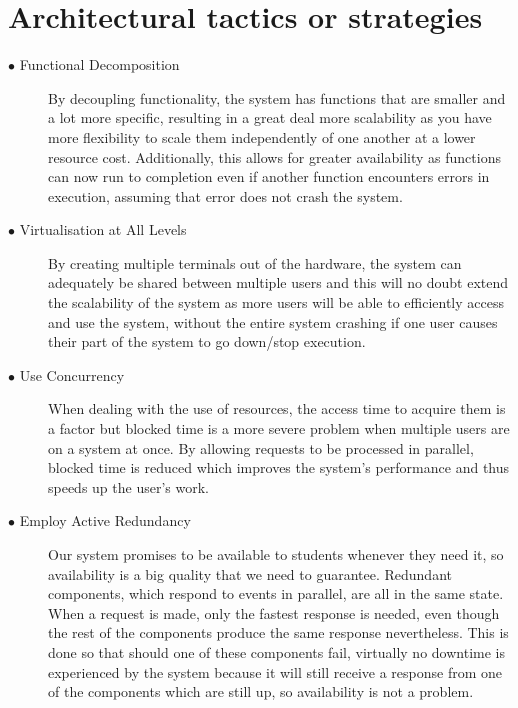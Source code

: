 \documentclass[hidelinks, 12pt]{article}
\begin{document}
\section{Architectural tactics or strategies}
\begin{description}
  \item[$\bullet$ Functional Decomposition]
  By decoupling functionality, the system has functions that are smaller and a lot more specific, resulting in a great deal more scalability as you have more flexibility to scale them independently of one another at a lower resource cost. Additionally, this allows for greater availability as functions can now run to completion even if another function encounters errors in execution, assuming that error does not crash the system.
  \item[$\bullet$ Virtualisation at All Levels]
  By creating multiple terminals out of the hardware, the system can adequately be shared between multiple users and this will no doubt extend the scalability of the system as more users will be able to efficiently access and use the system, without the entire system crashing if one user causes their part of the system to go down/stop execution.
  \item[$\bullet$ Use Concurrency]
  When dealing with the use of resources, the access time to acquire them is a factor but blocked time is a more severe problem when multiple users are on a system at once. By allowing requests to be processed in parallel, blocked time is reduced which improves the system's performance and thus speeds up the user's work.
  \item[$\bullet$ Employ Active Redundancy]
  Our system promises to be available to students whenever they need it, so availability is a big quality that we need to guarantee.
  Redundant components, which respond to events in parallel, are all in the same state. When a request is made, only the fastest response is needed, even though the rest of the components produce the same response nevertheless. This is done so that should one of these components fail, virtually no downtime is experienced by the system because it will still receive a response from one of the components which are still up, so availability is not a problem. 
\end{description}
\end{document}

